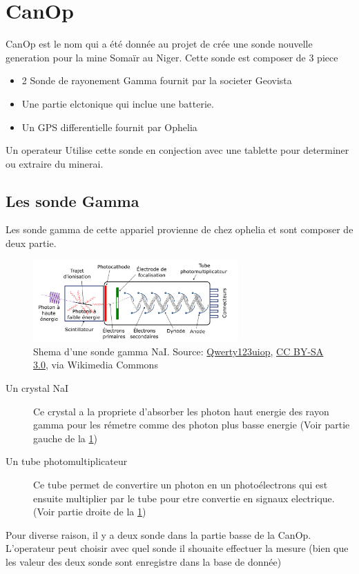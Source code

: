 \section{CanOp}
CanOp est le nom qui a été donnée au projet de crée une sonde nouvelle generation pour la mine Somaïr au Niger. Cette sonde est composer de 3 piece 
\begin{itemize}
    \item 2 Sonde de rayonement Gamma fournit par la societer Geovista
    \item Une partie elctonique qui inclue une batterie.
    \item Un GPS differentielle fournit par Ophelia 
\end{itemize}
Un operateur Utilise cette sonde en conjection avec une tablette pour determiner ou extraire du minerai. 
\subsection{Les sonde Gamma}
\label{ssec:sonde}
Les sonde gamma de cette appariel provienne de chez ophelia et sont composer de deux partie.
\begin{figure}
    \centering
    \includegraphics[width=0.7\textwidth]{img/she/Photomultiplier_coupled_to_a_scintillator_-_fr.png}
    \caption[Shema d'une sonde gamma NaI]{Shema d'une sonde gamma NaI. Source: \href{https://commons.wikimedia.org/wiki/File:Photomultiplier_coupled_to_a_scintillator_-_fr.png}{Qwerty123uiop}, \href{https://creativecommons.org/licenses/by-sa/3.0}{CC BY-SA 3.0}, via Wikimedia Commons}
    \label{fig:detecteur_gamma}
\end{figure}
\begin{description}
    \item[Un crystal NaI] Ce crystal a la propriete d'absorber les photon haut energie des rayon gamma pour les rémetre comme des photon plus basse energie (Voir partie gauche de la \cref{fig:detecteur_gamma})~\cite{site:explication_NaI}
    \item[Un tube photomultiplicateur] Ce tube permet de convertire un photon en un photoélectrons qui est ensuite multiplier par le tube pour etre convertie en signaux electrique. (Voir partie droite de la \cref{fig:detecteur_gamma})~\cite{site:explication_NaI}
\end{description}
Pour diverse raison, il y a deux sonde dans la partie basse de la CanOp. L'operateur peut choisir avec quel sonde il shouaite effectuer la mesure (bien que les valeur des deux sonde sont enregistre dans la base de donnée)

